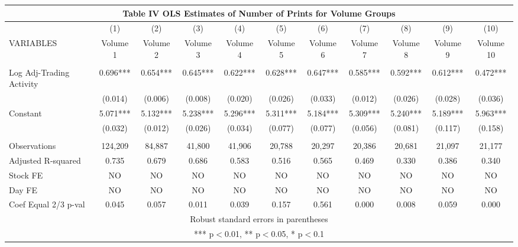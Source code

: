 \documentclass[]{article}
\begin{document}
\begin{tabular}{lcccccccccc}
\multicolumn{11}{c}{Table IV OLS Estimates of Number of Prints for Volume Groups} \\ \hline
 & (1) & (2) & (3) & (4) & (5) & (6) & (7) & (8) & (9) & (10) \\
VARIABLES & Volume 1 & Volume 2 & Volume 3 & Volume 4 & Volume 5 & Volume 6 & Volume 7 & Volume 8 & Volume 9 & Volume 10 \\ \hline
 &  &  &  &  &  &  &  &  &  &  \\
Log Adj-Trading Activity & 0.696*** & 0.654*** & 0.645*** & 0.622*** & 0.628*** & 0.647*** & 0.585*** & 0.592*** & 0.612*** & 0.472*** \\
 & (0.014) & (0.006) & (0.008) & (0.020) & (0.026) & (0.033) & (0.012) & (0.026) & (0.028) & (0.036) \\
Constant & 5.071*** & 5.132*** & 5.238*** & 5.296*** & 5.311*** & 5.184*** & 5.309*** & 5.240*** & 5.189*** & 5.963*** \\
 & (0.032) & (0.012) & (0.026) & (0.034) & (0.077) & (0.077) & (0.056) & (0.081) & (0.117) & (0.158) \\
 &  &  &  &  &  &  &  &  &  &  \\
Observations & 124,209 & 84,887 & 41,800 & 41,906 & 20,788 & 20,297 & 20,386 & 20,681 & 21,097 & 21,177 \\
Adjusted R-squared & 0.735 & 0.679 & 0.686 & 0.583 & 0.516 & 0.565 & 0.469 & 0.330 & 0.386 & 0.340 \\
Stock FE & NO & NO & NO & NO & NO & NO & NO & NO & NO & NO \\
Day FE & NO & NO & NO & NO & NO & NO & NO & NO & NO & NO \\
 Coef Equal 2/3 p-val & 0.045 & 0.057 & 0.011 & 0.039 & 0.157 & 0.561 & 0.000 & 0.008 & 0.059 & 0.000 \\ \hline
\multicolumn{11}{c}{ Robust standard errors in parentheses} \\
\multicolumn{11}{c}{ *** p$<$0.01, ** p$<$0.05, * p$<$0.1} \\
\end{tabular}
\end{document}
